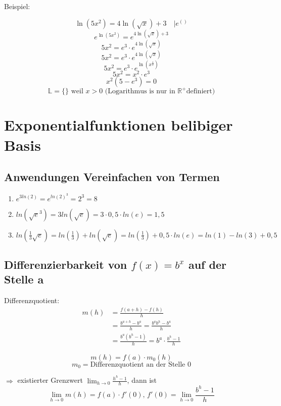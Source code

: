 \documentclass{scrbook}
\begin{document}
Beispiel:

\[ \ln(5x^2) = 4 \ln(\sqrt x)+3 \quad \vert e^{()}\]
\[e^{ \ln(5x^2) } = e^ {4 \ln(\sqrt x)+3 }\]
\[5x^2 = e^3\cdot e^{4 \ln(\sqrt x)}\]
\[5x^2 = e^3\cdot e^{4 \ln(\sqrt x)}\]
\[5x^2 = e^3 \cdot e^{\ln(x^{\frac 42})}\]
\[5x^2 = x^2 \cdot e^3\]
\[x^2(5-e^3) = 0\]
\[\mathbb{L} = \{\} \text{ weil }x > 0 \text{ (Logarithmus is nur in } \mathbb{R}^+ \text{definiert})\]



\section{Exponentialfunktionen belibiger Basis}

\subsection{Anwendungen Vereinfachen von Termen}

\begin {enumerate}
\item $ e^{3ln(2)} = e ^{ln(2)^3} = 2^3 = 8$
\item $ln(\sqrt e ^3) = 3 ln(\sqrt e) = 3 \cdot 0,5 \cdot ln(e) = 1,5$ 
\item $ln(\frac 1 3 \sqrt e) = ln(\frac 1 3 ) + ln(\sqrt e) = ln(\frac 1 3 ) + 0,5 \cdot ln(e) = ln(1) - ln(3) + 0,5 $

\end{enumerate}




\subsection{Differenzierbarkeit von $f(x) = b^x$ auf der Stelle a}

Differenzquotient:
\begin{equation*}
\begin{aligned}
m(h) &= \frac {f(a+h) - f(h)}{h}
\\
&= \frac {b^{a+h}-b^a}{h} = \frac {b^a b^h - b^a}h
\\
&= \frac{b^a(b^h - 1)}h = b^a \cdot \frac {b^h - 1}h
\end{aligned}
\end{equation*}

\[m(h) = f(a) \cdot m_0(h)\]
\[m_0 = \text{Differenzquotient an der Stelle } 0\]


$\Rightarrow$ existierter Grenzwert $\lim_{h\rightarrow 0}\frac{h^h-1}h$, dann ist 
\[\lim_{h \rightarrow 0}m(h) = f(a) \cdot f'(0), \, f'(0) = \lim_{h \rightarrow0} \frac {b^h - 1}h\]
\end{document}
